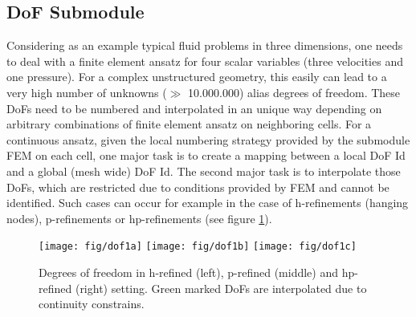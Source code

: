 \subsection{DoF Submodule}

Considering as an example typical fluid problems in three dimensions, one needs to deal
with a finite element ansatz for four scalar variables (three velocities and one pressure).
For a complex unstructured geometry, this easily can lead to a very high number 
of unknowns ($\gg$ 10.000.000) alias degrees of freedom. These DoFs need to be
numbered and interpolated in an unique way depending on arbitrary combinations
of finite element ansatz on neighboring cells. For a continuous ansatz, given 
the local numbering strategy provided by the submodule FEM on each cell, one major 
task is to create a mapping between a local DoF Id and a global (mesh wide) DoF Id. 
The second major task is to interpolate those DoFs, which are restricted due to
conditions provided by FEM and cannot be identified. Such cases can occur for example
in the case of h-refinements (hanging nodes), p-refinements or hp-refinements
(see figure \ref{fig:Degrees-of-freedom}).  

\begin{figure}
\noindent
\begin{centering}
\texttt{[image: fig/dof1a]}
\texttt{[image: fig/dof1b]}
\texttt{[image: fig/dof1c]}
\par\end{centering}
\caption{\label{fig:Degrees-of-freedom}Degrees of freedom in h-refined (left), p-refined (middle) and hp-refined (right) setting. Green marked DoFs are interpolated due to continuity constrains.}
\end{figure}

